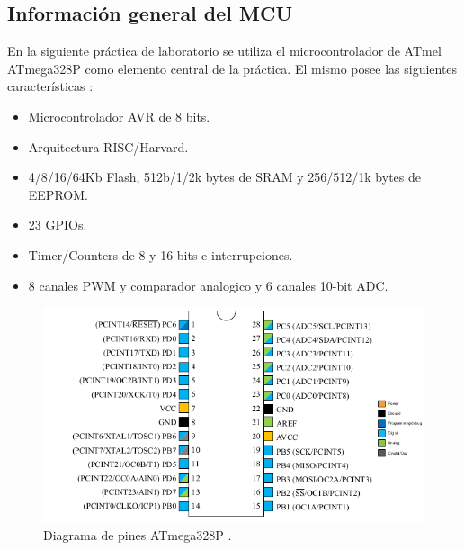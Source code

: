 \subsection{Información general del MCU}


En la siguiente práctica de laboratorio se utiliza el microcontrolador de ATmel ATmega328P como
elemento central de la práctica. El mismo posee las siguientes características \cite{ppt}:

\begin{itemize}
    \item Microcontrolador AVR de 8 bits.
    \item Arquitectura RISC/Harvard.
    \item 4/8/16/64Kb Flash, 512b/1/2k bytes de
SRAM y 256/512/1k bytes de EEPROM.
\item 23 GPIOs.
\item Timer/Counters de 8 y 16 bits e interrupciones.
\item 8 canales PWM y comparador
analogico y 6 canales 10-bit ADC.
    
\end{itemize}






\begin{figure}[H]
\centering
\includegraphics[scale=0.8]{./images/pines.png} 
\caption{Diagrama de pines ATmega328P \cite{mcu}.}
\label{f1}
\end{figure}

